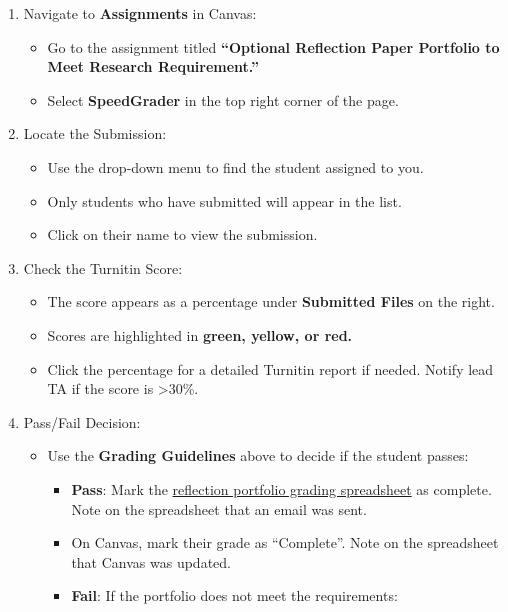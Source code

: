 \documentclass[
]{article}
\providecommand{\tightlist}{%
  \setlength{\itemsep}{0pt}\setlength{\parskip}{0pt}}
\begin{document}
\begin{enumerate}
\def\labelenumi{\arabic{enumi}.}
\tightlist
\item
  Navigate to \textbf{Assignments} in Canvas:

  \begin{itemize}
  \tightlist
  \item
    Go to the assignment titled \textbf{``Optional Reflection Paper Portfolio to Meet Research Requirement.''}
  \item
    Select \textbf{SpeedGrader} in the top right corner of the page.
  \end{itemize}
\item
  Locate the Submission:

  \begin{itemize}
  \tightlist
  \item
    Use the drop-down menu to find the student assigned to you.\\
  \item
    Only students who have submitted will appear in the list.\\
  \item
    Click on their name to view the submission.
  \end{itemize}
\item
  Check the Turnitin Score:

  \begin{itemize}
  \tightlist
  \item
    The score appears as a percentage under \textbf{Submitted Files} on the right.\\
  \item
    Scores are highlighted in \textbf{green, yellow, or red.}\\
  \item
    Click the percentage for a detailed Turnitin report if needed. Notify lead TA if the score is \textgreater30\%.
  \end{itemize}
\item
  Pass/Fail Decision:

  \begin{itemize}
  \tightlist
  \item
    Use the \textbf{Grading Guidelines} above to decide if the student passes:

    \begin{itemize}
    \tightlist
    \item
      \textbf{Pass}: Mark the \href{https://docs.google.com/spreadsheets/d/1tOP3nKaxPEMGZprCt2eqzTt-4ICCyVoQgQQBqT2EKrE/edit?gid=1778739291\#gid=1778739291}{reflection portfolio grading spreadsheet} as complete. Note on the spreadsheet that an email was sent.
    \item
      On Canvas, mark their grade as ``Complete''. Note on the spreadsheet that Canvas was updated.
    \item
      \textbf{Fail}: If the portfolio does not meet the requirements:


\end{itemize}
\end{itemize}
\end{enumerate}
\end{document}
